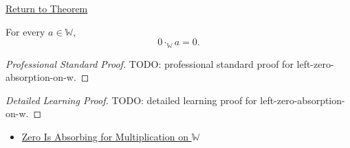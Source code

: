 \newpage
{}
\label{prf:left-zero-absorption-on-w}

\begin{remark*}[Return]
\hyperref[thm:left-zero-absorption-on-w]{Return to Theorem}
\end{remark*}

\begin{theorem*}
For every $a\in\mathbb{W}$,
\[
0\cdot_{\mathbb{W}}a=0.
\]
\end{theorem*}

\begin{proof}[Professional Standard Proof]
\LRAProofBodyStart
TODO: professional standard proof for left-zero-absorption-on-w.
\end{proof}

\begin{proof}[Detailed Learning Proof]
\LRAProofBodyStart
TODO: detailed learning proof for left-zero-absorption-on-w.
\end{proof}

\begin{remark*}
\end{remark*}

\begin{dependencies}
\begin{itemize}
  \item \hyperref[thm:zero-absorbing-for-multiplication-on-w]{Zero Is Absorbing for Multiplication on $\mathbb{W}$}
\end{itemize}
\end{dependencies}

\clearpage
